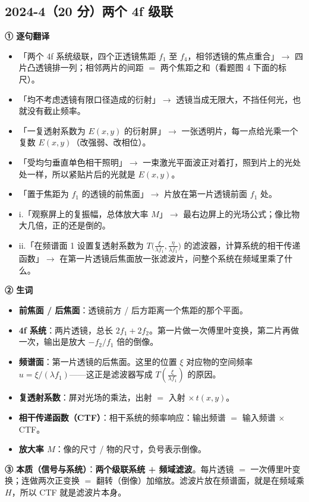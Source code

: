 \subsection{2024-4（20 分）两个 4f 级联}\label{ex:2024-4}
\label{rd:2024-4}
\begin{idea}[读题：这道题在说什么]
\textbf{① 逐句翻译}
\begin{itemize}
\item 「两个 4f 系统级联，四个正透镜焦距 $f_1$ 至 $f_4$，相邻透镜的焦点重合」$\to$ 四片凸透镜排一列；相邻两片的间距 $=$ 两个焦距之和（看题图 4 下面的标尺）。
\item 「均不考虑透镜有限口径造成的衍射」$\to$ 透镜当成无限大，不挡任何光，也就没有截止频率。
\item 「一复透射系数为 $E(x,y)$ 的衍射屏」$\to$ 一张透明片，每一点给光乘一个复数 $E(x,y)$（改强弱、改相位）。
\item 「受均匀垂直单色相干照明」$\to$ 一束激光平面波正对着打，照到片上的光处处一样，所以紧贴片后的光就是 $E(x,y)$。
\item 「置于焦距为 $f_1$ 的透镜的前焦面」$\to$ 片放在第一片透镜前面 $f_1$ 处。
\item i.「观察屏上的复振幅，总体放大率 $M$」$\to$ 最右边屏上的光场公式；像比物大几倍，正的还是倒的。
\item ii.「在频谱面 1 设置复透射系数为 $T\big(\frac{\xi}{\lambda f_1},\frac{\eta}{\lambda f_1}\big)$ 的滤波器，计算系统的相干传递函数」$\to$ 在第一片透镜后焦面放一张滤波片，问整个系统在频域里乘了什么。
\end{itemize}
\textbf{② 生词}
\begin{itemize}
\item \textbf{前焦面 / 后焦面}：透镜前方 / 后方距离一个焦距的那个平面。
\item \textbf{4f 系统}：两片透镜，总长 $2f_1+2f_2$。第一片做一次傅里叶变换，第二片再做一次，输出是放大 $-f_2/f_1$ 倍的倒像。
\item \textbf{频谱面}：第一片透镜的后焦面。这里的位置 $\xi$ 对应物的空间频率 $u=\xi/(\lambda f_1)$——这正是滤波器写成 $T(\frac{\xi}{\lambda f_1})$ 的原因。
\item \textbf{复透射系数}：屏对光场的乘法，出射 $=$ 入射 $\times\,t(x,y)$。
\item \textbf{相干传递函数（CTF）}：相干系统的频率响应：输出频谱 $=$ 输入频谱 $\times$ CTF。
\item \textbf{放大率 $M$}：像的尺寸 / 物的尺寸，负号表示倒像。
\end{itemize}
\textbf{③ 本质（信号与系统）}：\textbf{两个级联系统 + 频域滤波}。每片透镜 $=$ 一次傅里叶变换；连做两次正变换 $=$ 翻转（倒像）加缩放。滤波片放在频谱面，就是在频域乘 $H$，所以 CTF 就是滤波片本身。


\end{idea}
